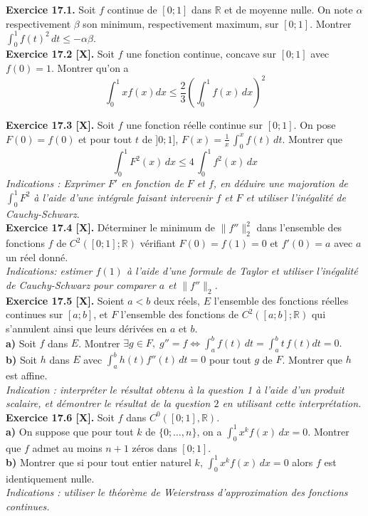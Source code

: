\documentclass[a4paper,12pt,francais]{article}
\newcommand{\field}[1]{\mathbb{#1}}
\newcommand{\R}{\field{R}}
\begin{document}
\noindent
{\bf Exercice 17.1.} Soit $f$ continue de $[0;1]$ dans $\R$ et de moyenne
nulle. On note $\alpha$ respectivement $\beta$ son minimum,
respectivement maximum, sur $[0;1]$. Montrer 
$\int_0^1 f(t)^2 \, dt \leqslant - \alpha \beta$.\\

\noindent
{\bf Exercice 17.2 [X].} Soit $f$ une fonction continue, concave sur
$[0;1]$ avec $f(0)=1$. Montrer qu'on a 
$$\int_0^1 xf(x)dx\leqslant \frac{2}{3} {\left({\int_0^1 f(x)\, dx
}\right)}^2$$

\noindent
{\bf Exercice 17.3 [X].} Soit $f$ une fonction réelle continue sur
$[0;1]$. On pose $F(0)=f(0)$ et pour tout $t$ de $]0;1]$,
    $F(x)=\frac{1}{x} \, \int_0^x f(t) \,dt$. Montrer que 
$$\int_0^1 F^2(x) \, dx \leqslant 4\, \int_0^1 f^2(x)\, dx$$
{\it Indications : Exprimer $F'$ en fonction de $F$ et $f$, en déduire
  une majoration de $\int_0^1 F^2$ à l'aide d'une intégrale faisant
  intervenir $f$ et $F$ et utiliser l'inégalité de Cauchy-Schwarz}.\\

\noindent
{\bf Exercice 17.4 [X].} Déterminer le minimum de $\|f''\|_2^2$ dans
l'ensemble des fonctions $f$ de $C^2([0;1];\R)$ vérifiant
$F(0)=f(1)=0$ et $f'(0)=a$ avec $a$ un réel donné.\\
{\it Indications: estimer $f(1)$ à l'aide d'une formule de Taylor et
  utiliser l'inégalité de Cauchy-Schwarz pour comparer $a$ et $\|f''\|_2$.}\\

\noindent
{\bf Exercice 17.5 [X].} Soient $a<b$ deux réels, $E$ l'ensemble des
fonctions réelles continues sur $[a;b]$, et $F$ l'ensemble des
fonctions de $C^2([a;b];\R)$ qui s'annulent ainsi que leurs dérivées
en $a$ et $b$.\\
{\bf a)} Soit $f$ dans $E$. Montrer $\displaystyle \exists g \in F,\;
g''=f\Longleftrightarrow \int_a^b f(t)\, dt =\int_a^b t\,f(t) dt =0.$\\
{\bf b)} Soit $h$ dans $E$ avec $\int_a^b h(t)f''(t)\, dt=0$ pour tout
$g$ de $F$. Montrer que $h$ est affine.\\
{\it Indication : interpréter le résultat obtenu à la question 1 à l'aide
  d'un produit scalaire, et démontrer le résultat de la question $2$
  en utilisant cette interprétation.}\\

\noindent
{\bf Exercice 17.6 [X].} Soit $f$ dans $C^0([0;1],\R)$.\\
{\bf a)} On suppose que pour tout $k$ de $\{0;\dots ,n\}$, on a
$\int_0^1 x^kf(x)\, dx=0$. Montrer que $f$ admet au moins $n+1$ zéros
dans $[0;1]$.\\
{\bf b)} Montrer que si pour tout entier naturel $k$, $\int_0^1 x^k
f(x) \, dx=0$ alors $f$ est identiquement nulle.\\
{\it Indications : utiliser le théorème de Weierstrass d'approximation
  des fonctions continues.}\\
\end{document}
